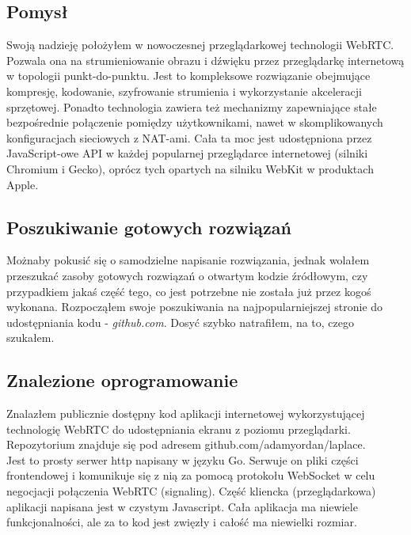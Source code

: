 \documentclass[a4paper,11pt]{article}
\begin{document}
        \subsection{Pomysł}
        Swoją nadzieję położyłem w nowoczesnej przeglądarkowej technologii WebRTC. Pozwala ona na strumieniowanie obrazu i dźwięku przez przeglądarkę internetową w topologii punkt-do-punktu. 
        Jest to kompleksowe rozwiązanie obejmujące kompresję, kodowanie, szyfrowanie strumienia i wykorzystanie akceleracji sprzętowej.
        Ponadto technologia zawiera też mechanizmy zapewniające stałe bezpośrednie połączenie pomiędzy użytkownikami, nawet w skomplikowanych konfiguracjach sieciowych z NAT-ami.
        Cała ta moc jest udostępniona przez JavaScript-owe API w każdej popularnej przeglądarce internetowej (silniki Chromium i Gecko), oprócz tych opartych na silniku WebKit w produktach Apple. 
        \subsection{Poszukiwanie gotowych rozwiązań}
        Możnaby pokusić się o samodzielne napisanie rozwiązania, jednak wolałem przeszukać zasoby gotowych rozwiązań o otwartym kodzie źródłowym,
        czy przypadkiem jakaś część tego, co jest potrzebne nie została już przez kogoś wykonana.
        Rozpocząłem swoje poszukiwania na najpopularniejszej stronie do udostępniania kodu - \emph{github.com}. Dosyć szybko natrafiłem, na to, czego szukałem.
        \subsection{Znalezione oprogramowanie}
        Znalazłem publicznie dostępny kod aplikacji internetowej wykorzystującej technologię WebRTC do udostępniania ekranu z poziomu przeglądarki. \\
        Repozytorium znajduje się pod adresem github.com/adamyordan/laplace. \\
        Jest to prosty serwer http napisany w języku Go. 
        Serwuje on pliki części frontendowej i komunikuje się z nią za pomocą protokołu WebSocket w celu negocjacji połączenia WebRTC (signaling). 
        Część kliencka (przeglądarkowa) aplikacji napisana jest w czystym Javascript. Cała aplikacja ma niewiele funkcjonalności, ale za to kod jest zwięzły i całość ma niewielki rozmiar.
\end{document}
